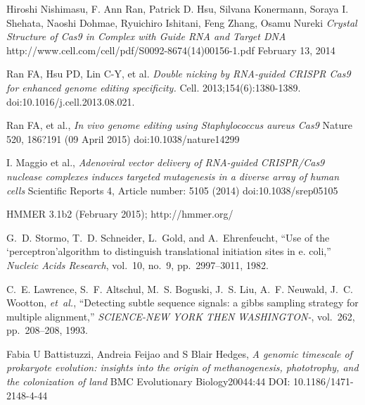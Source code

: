 \documentclass[11pt, oneside]{article}
\begin{document}
\begin{thebibliography}{1}
Hiroshi Nishimasu, F. Ann Ran, Patrick D. Hsu, Silvana Konermann, Soraya I. Shehata, Naoshi Dohmae, Ryuichiro Ishitani, Feng Zhang, Osamu Nureki \emph{Crystal Structure of Cas9 in Complex with Guide RNA and Target DNA} http://www.cell.com/cell/pdf/S0092-8674(14)00156-1.pdf February 13, 2014

Ran FA, Hsu PD, Lin C-Y, et al. \emph{Double nicking by RNA-guided CRISPR Cas9 for enhanced genome editing specificity.} Cell. 2013;154(6):1380-1389. doi:10.1016/j.cell.2013.08.021.

Ran FA,  et al., \emph{In vivo genome editing using Staphylococcus aureus Cas9} Nature 520, 186?191 (09 April 2015) doi:10.1038/nature14299

I. Maggio et al., \emph{Adenoviral vector delivery of RNA-guided CRISPR/Cas9 nuclease complexes induces targeted mutagenesis in a diverse array of human cells} Scientific Reports 4, Article number: 5105 (2014) doi:10.1038/srep05105


HMMER 3.1b2 (February 2015); http://hmmer.org/

G.~D. Stormo, T.~D. Schneider, L.~Gold, and A.~Ehrenfeucht, ``Use of the
  ‘perceptron’algorithm to distinguish translational initiation sites in e.
  coli,'' {\em Nucleic Acids Research}, vol.~10, no.~9, pp.~2997--3011, 1982.

C.~E. Lawrence, S.~F. Altschul, M.~S. Boguski, J.~S. Liu, A.~F. Neuwald, J.~C.
  Wootton, {\em et~al.}, ``Detecting subtle sequence signals: a gibbs sampling
  strategy for multiple alignment,'' {\em SCIENCE-NEW YORK THEN WASHINGTON-},
  vol.~262, pp.~208--208, 1993.
  
Fabia U Battistuzzi, Andreia Feijao and S Blair Hedges, \emph{A genomic timescale of prokaryote evolution: insights into the origin of methanogenesis, phototrophy, and the colonization of land} BMC Evolutionary Biology20044:44
DOI: 10.1186/1471-2148-4-44

\end{thebibliography}

% 
\end{document}
